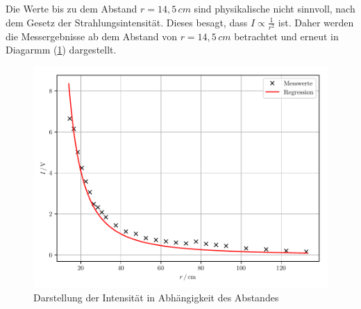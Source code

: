 Die Werte bis zu dem Abstand $r = 14,5 \, cm$ sind physikalische nicht sinnvoll, nach
dem Gesetz der Strahlungsintensität. Dieses besagt, dass $I \propto \frac{1}{r^2}$ ist.
Daher werden die Messergebnisse ab dem Abstand von $r = 14,5 \, cm$ betrachtet und erneut in
Diagarmm (\ref{abb:7}) dargestellt.

\begin{figure}[H]
\centering
\includegraphics[width=\textwidth]{plot4.pdf}
\caption{Darstellung der Intensität in Abhängigkeit des Abstandes}
\label{abb:7}
\end{figure}
